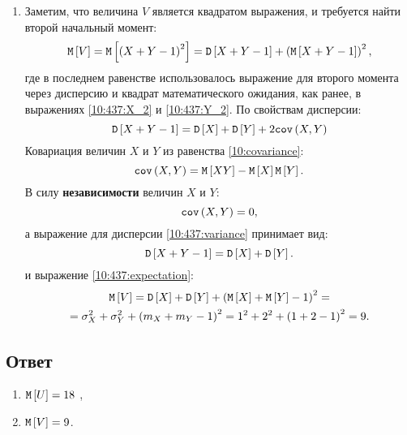\begin{enumerate}
    \item Заметим, что величина $V$ является квадратом выражения, и требуется найти второй начальный момент:
    \begin{equation}
        \label{10:437:expectation}
        \mathtt{M} \left [ V \right ] = \mathtt{M} \left [ \left ( X + Y - 1 \right )^2 \right ] = \mathtt{D} \left [ X + Y - 1 \right ] + \left ( \mathtt{M} \left [ X + Y - 1 \right ] \right )^2 ,
    \end{equation}
    где в последнем равенстве использовалось выражение для второго момента через дисперсию и квадрат математического ожидания, как ранее, в выражениях \eqref{10:437:X_2}
    и \eqref{10:437:Y_2}.
    По свойствам дисперсии:
    \begin{equation}
        \label{10:437:variance}
        \mathtt{D} \left [ X + Y - 1 \right ] = \mathtt{D} \left [ X \right ] + \mathtt{D} \left [ Y \right ] + 2 \texttt{cov} \left ( X , Y \right )
    \end{equation}
    Ковариация величин $X$ и $Y$ из равенства \eqref{10:covariance}:
    \begin{equation}
        \texttt{cov} \left ( X , Y \right ) = \mathtt{M} \left [ XY \right ] - \mathtt{M} \left [ X \right ] \mathtt{M} \left [ Y \right ].
    \end{equation}
    В силу \textbf{независимости} величин $X$ и $Y$:
    \begin{equation}
        \texttt{cov} \left ( X , Y \right ) = 0 ,
    \end{equation}
    а выражение для дисперсии \eqref{10:437:variance} принимает вид:
    \begin{equation}
        \mathtt{D} \left [ X + Y - 1 \right ] = \mathtt{D} \left [ X \right ] + \mathtt{D} \left [ Y \right ] .
    \end{equation}
    и выражение \eqref{10:437:expectation}:
    \begin{multline}
        \mathtt{M} \left [ V \right ]
        = \mathtt{D} \left [ X \right ] + \mathtt{D} \left [ Y \right ] + \left ( \mathtt{M} \left [ X \right ] + \mathtt{M} \left [ Y \right ] - 1 \right )^2 = \\
        = \sigma_X^2 + \sigma_Y^2 + \left ( m_X + m_Y - 1 \right )^2
        = 1^2
        + 2^2 + \left ( 1 + 2 - 1 \right )^2
        = 9.
    \end{multline}
\end{enumerate}

\subsection*{Ответ}
\begin{enumerate}
    \item $\mathtt{M} \left [ U \right ] = 18$ ,
    \item $\mathtt{M} \left [ V \right ] = 9$.
\end{enumerate}



